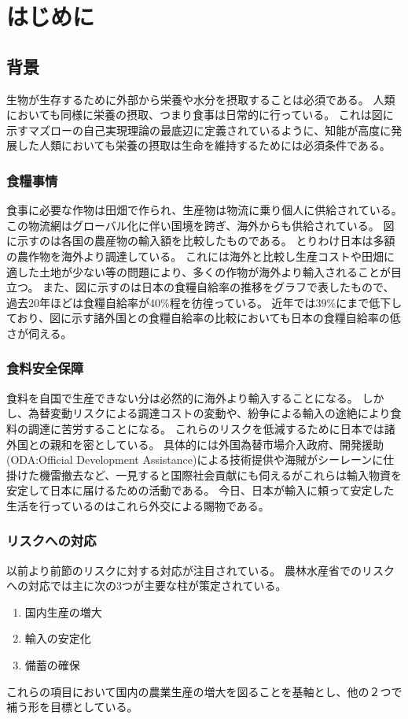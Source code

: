 \chapter{はじめに}
\section{背景}
生物が生存するために外部から栄養や水分を摂取することは必須である。
人類においても同様に栄養の摂取、つまり食事は日常的に行っている。
これは図に示すマズローの自己実現理論の最底辺に定義されているように、知能が高度に発展した人類においても栄養の摂取は生命を維持するためには必須条件である。
\subsection{食糧事情}
食事に必要な作物は田畑で作られ、生産物は物流に乗り個人に供給されている。
この物流網はグローバル化に伴い国境を跨ぎ、海外からも供給されている。
図に示すのは各国の農産物の輸入額を比較したものである。
とりわけ日本は多額の農作物を海外より調達している。
これには海外と比較し生産コストや田畑に適した土地が少ない等の問題により、多くの作物が海外より輸入されることが目立つ。
また、図に示すのは日本の食糧自給率の推移をグラフで表したもので、過去20年ほどは食糧自給率が40\%程を彷徨っている。
近年では39\%にまで低下しており、図に示す諸外国との食糧自給率の比較においても日本の食糧自給率の低さが伺える。
\subsection{食料安全保障}
食料を自国で生産できない分は必然的に海外より輸入することになる。
しかし、為替変動リスクによる調達コストの変動や、紛争による輸入の途絶により食料の調達に苦労することになる。
これらのリスクを低減するために日本では諸外国との親和を密としている。
具体的には外国為替市場介入政府、開発援助 (ODA:Official Development Assistance)による技術提供や海賊がシーレーンに仕掛けた機雷撤去など、一見すると国際社会貢献にも伺えるがこれらは輸入物資を安定して日本に届けるための活動である。
今日、日本が輸入に頼って安定した生活を行っているのはこれら外交による賜物である。
\subsection{リスクへの対応}
以前より前節のリスクに対する対応が注目されている。
農林水産省でのリスクへの対応では主に次の3つが主要な柱が策定されている。
\begin{enumerate}
    \item 国内生産の増大
    \item 輸入の安定化
    \item 備蓄の確保
\end{enumerate}
これらの項目において国内の農業生産の増大を図ることを基軸とし、他の２つで補う形を目標としている。

